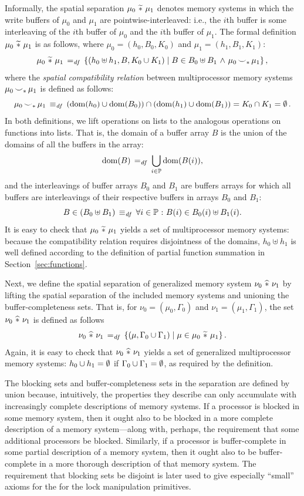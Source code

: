 \documentclass[11pt]{report}         %
\begin{document}
Informally, the spatial separation $\mu_0 \operatorname{\,\widetilde{\ast}\,} \mu_1$ denotes memory systems in which the write buffers of $\mu_0$ and $\mu_1$ are pointwise-interleaved: i.e., the $i$th buffer is some interleaving of the $i$th buffer of $\mu_0$ and the $i$th buffer of $\mu_1$. The formal definition $\mu_0 \operatorname{\,\widetilde{\ast}\,} \mu_1$ is as follows, where $\mu_0 = (h_0,B_0,K_0)$ and $\mu_1 = (h_1,B_1,K_1)$: \[ \mu_0 \operatorname{\,\widetilde{\ast}\,} \mu_1 \operatorname{\;=_{\mathit{df}}\;} \left\lbrace (h_0 \uplus h_1, B, K_0 \cup K_1) \mid B \in B_0 \uplus B_1 \operatorname{\,\wedge\,} \mu_0 \operatorname{\smile}_\ast \mu_1 \right\rbrace,\] where the \emph{spatial compatibility relation} between multiprocessor memory systems $\mu_0 \operatorname{\smile}_\ast \mu_1$ is defined as follows: \[ \mu_0 \operatorname{\smile}_\ast \mu_1 \operatorname{\;\equiv_{\mathit{df}}\;} \left(\operatorname{\mathrm{dom}}(h_0) \cup \operatorname{\mathrm{dom}}(B_0) \right) \cap \left( \operatorname{\mathrm{dom}}(h_1) \cup \operatorname{\mathrm{dom}}(B_1) \right) = K_0 \cap K_1 = \operatorname{\emptyset}.\] In both definitions, we lift operations on lists to the analogous operations on functions into lists. That is, the domain of a buffer array $B$ is the union of the domains of all the buffers in the array:  \[ \operatorname{\mathrm{dom}}(B) \operatorname{\;=_{\mathit{df}}\;} \bigcup_{i \in \mathbb{P}} \operatorname{\mathrm{dom}}(B(i)),\] and the interleavings of buffer arrays $B_0$ and $B_1$ are buffers arrays for which all buffers are interleavings of their respective buffers in arrays $B_0$ and $B_1$: \[ B \in (B_0 \uplus B_1) \operatorname{\;\equiv_{\mathit{df}}\;} \forall i \in \mathbb{P} \operatorname{\,:\,} B(i) \in B_0(i) \uplus B_1(i).\] It is easy to check that $\mu_0 \operatorname{\,\widetilde{\ast}\,} \mu_1$ yields a set of multiprocessor memory systems: because the compatibility relation requires disjointness of the domains, $h_0 \uplus h_1$ is well defined according to the definition of partial function summation in Section~\ref{sec:functions}. 

Next, we define the spatial separation of generalized memory system $\nu_0 \operatorname{\,\widehat{\ast}\,} \nu_1$ by lifting the spatial separation of the included memory systems and unioning the buffer-completeness sets. That is, for $\nu_0 = (\mu_0,\Gamma_0)$ and $\nu_1 = (\mu_1,\Gamma_1)$, the set $\nu_0 \operatorname{\,\widehat{\ast}\,} \nu_1$ is defined as follows \[ \nu_0 \operatorname{\,\widehat{\ast}\,} \nu_1 \operatorname{\;=_{\mathit{df}}\;} \left\lbrace (\mu,\Gamma_0 \cup \Gamma_1) \mid \mu \in \mu_0 \operatorname{\,\widetilde{\ast}\,} \mu_1 \right\rbrace.\] Again, it is easy to check that $\nu_0 \operatorname{\,\widehat{\ast}\,} \nu_1$ yields a set of generalized multiprocessor memory systems: $h_0 \cup h_1 = \operatorname{\emptyset}$ if $\Gamma_0 \cup \Gamma_1 = \operatorname{\emptyset}$, as required by the definition. 

The blocking sets and buffer-completeness sets in the separation are defined by union because, intuitively, the properties they describe can only accumulate with increasingly complete descriptions of memory systems. If a processor is blocked in some memory system, then it ought also to be blocked in a more complete description of a memory system---along with, perhaps, the requirement that some additional processors be blocked. Similarly, if a processor is buffer-complete in some partial description of a memory system, then it ought also to be buffer-complete in a more thorough description of that memory system. The requirement that blocking sets be disjoint is later used to give especially ``small'' axioms for the for the lock manipulation primitives. 
\end{document}
